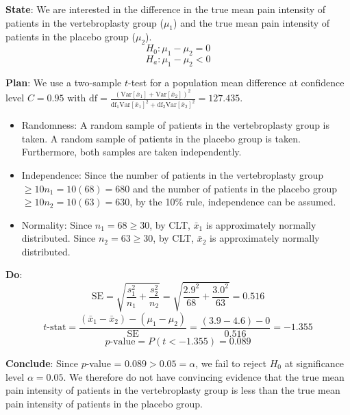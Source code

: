 \documentclass{article}
\begin{document}
\textbf{State}: We are interested in the difference in the true mean pain intensity of patients in the vertebroplasty group (\(\mu_1\)) and the true mean pain intensity of patients in the placebo group (\(\mu_2\)).
   $$H_0: \mu_1 - \mu_2 = 0$$
   $$H_a: \mu_1 - \mu_2 < 0$$\newline

\textbf{Plan}: We use a two-sample \(t\)-test for a population mean difference at confidence level \(C = 0.95\) with \(\textrm{df} = \frac{\left( \mathrm{Var}[\bar{x}_1] + \mathrm{Var}[\bar{x}_2] \right)^2}{ \mathrm{df}_1 \mathrm{Var}[\bar{x}_1]^2 + \mathrm{df}_2 \mathrm{Var}[\bar{x}_2]^2} = 127.435\).
\begin{itemize}
\item    Randomness: A random sample of patients in the vertebroplasty group is taken. A random sample of patients in the placebo group is taken. Furthermore, both samples are taken independently.

\item    Independence: Since the number of patients in the vertebroplasty group \(\geq 10n_1= 10(68) = 680\) and the number of patients in the placebo group \(\geq 10n_2= 10(63) = 630\), by the 10\% rule, independence can be assumed.

\item    Normality: Since \(n_1 = 68 \geq 30\), by CLT, \(\bar{x}_1\) is approximately normally distributed.
Since \(n_2 = 63 \geq 30\), by CLT, \(\bar{x}_2\) is approximately normally distributed.
\end{itemize}\newline

\textbf{Do}: $$\textrm{SE} = \sqrt{ \frac{s_1 ^2}{n_1} + \frac{s_2 ^2}{n_2} } = \sqrt{ \frac{2.9^2}{68} + \frac{3.0^2}{63} } = 0.516$$
$$t\textrm{-stat} = \frac{ (\bar{x}_1 - \bar{x}_2) - (\mu_1 - \mu_2) }{\textrm{SE}} = \frac{ (3.9 - 4.6) - 0}{0.516} = -1.355$$
$$p\textrm{-value} = P(t < -1.355) =0.089$$\newline

\textbf{Conclude}: Since \(p\)-value = \(0.089 > 0.05 = \alpha\), we fail to reject \(H_0\) at significance level \(\alpha = 0.05\).
We therefore do not have convincing evidence that the true mean pain intensity of patients in the vertebroplasty group is less than the true mean pain intensity of patients in the placebo group.
\end{document}
